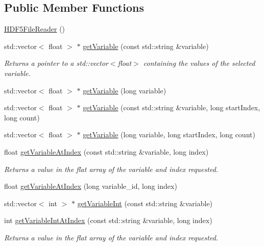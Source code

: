 \subsection*{Public Member Functions}
\begin{DoxyCompactItemize}
\item 
\hyperlink{classccmc_1_1_h_d_f5_file_reader_aa3382466b3e80849c9c03f7400c9dc17}{HDF5FileReader} ()
\item 
std::vector$<$ float $>$ $\ast$ \hyperlink{classccmc_1_1_h_d_f5_file_reader_a69e8ed3754fb9627d21cb5556b2e1223}{getVariable} (const std::string \&variable)
\begin{DoxyCompactList}\small\item\em Returns a pointer to a std::vector$<$float$>$ containing the values of the selected variable. \end{DoxyCompactList}\item 
std::vector$<$ float $>$ $\ast$ \hyperlink{classccmc_1_1_h_d_f5_file_reader_a52e50180779e1b743d2a4766b9fc842b}{getVariable} (long variable)
\item 
std::vector$<$ float $>$ $\ast$ \hyperlink{classccmc_1_1_h_d_f5_file_reader_a7ee5a24334d0056b2350a1505f38b095}{getVariable} (const std::string \&variable, long startIndex, long count)
\item 
std::vector$<$ float $>$ $\ast$ \hyperlink{classccmc_1_1_h_d_f5_file_reader_abb117e460234e1c06b44bcbaaf52108e}{getVariable} (long variable, long startIndex, long count)
\item 
float \hyperlink{classccmc_1_1_h_d_f5_file_reader_a544b306f0f39ab05b921a6016f164d03}{getVariableAtIndex} (const std::string \&variable, long index)
\begin{DoxyCompactList}\small\item\em Returns a value in the flat array of the variable and index requested. \end{DoxyCompactList}\item 
float \hyperlink{classccmc_1_1_h_d_f5_file_reader_aaa4d2db7154044d63f62f497e99b6b49}{getVariableAtIndex} (long variable\_\-id, long index)
\item 
std::vector$<$ int $>$ $\ast$ \hyperlink{classccmc_1_1_h_d_f5_file_reader_a3946081d5b79e78300ac8cbe04446a80}{getVariableInt} (const std::string \&variable)
\item 
int \hyperlink{classccmc_1_1_h_d_f5_file_reader_a216a98563f5a62fc12ea414552f65b55}{getVariableIntAtIndex} (const std::string \&variable, long index)
\begin{DoxyCompactList}\small\item\em Returns a value in the flat array of the variable and index requested. \end{DoxyCompactList}\item 

\end{DoxyCompactItemize}
